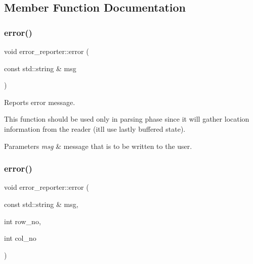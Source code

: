 \subsection{Member Function Documentation}
\mbox{\label{classjawe_1_1error__reporter_acfa7b31326b9919ecdd1d1c13053c658}} 
\subsubsection{\texorpdfstring{error()}{error()}\hspace{0.1cm}{\footnotesize\ttfamily [1/3]}}
{\footnotesize\ttfamily void error\+\_\+reporter\+::error (\begin{DoxyParamCaption}\item[{const std\+::string \&}]{msg }\end{DoxyParamCaption})\hspace{0.3cm}{\ttfamily [static]}}

Reports error message.

This function should be used only in parsing phase since it will gather location information from the reader (it\textquotesingle{}ll use lastly buffered state).


\begin{DoxyParams}{Parameters}
{\em msg} & message that is to be written to the user. \\
\hline
\end{DoxyParams}
\mbox{\label{classjawe_1_1error__reporter_a61739ea73525d07a47a1054ec3de88dc}} 
\subsubsection{\texorpdfstring{error()}{error()}\hspace{0.1cm}{\footnotesize\ttfamily [2/3]}}
{\footnotesize\ttfamily void error\+\_\+reporter\+::error (\begin{DoxyParamCaption}\item[{const std\+::string \&}]{msg,  }\item[{int}]{row\+\_\+no,  }\item[{int}]{col\+\_\+no }\end{DoxyParamCaption})\hspace{0.3cm}{\ttfamily [static]}}

